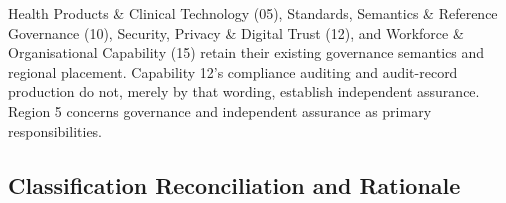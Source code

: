 Health Products \& Clinical Technology (05), Standards, Semantics \& Reference Governance (10), Security, Privacy \& Digital Trust (12), and Workforce \& Organisational Capability (15) retain their existing governance semantics and regional placement. Capability 12's compliance auditing and audit-record production do not, merely by that wording, establish independent assurance. Region 5 concerns governance and independent assurance as primary responsibilities.

\label{rad:business:1164}

\par\smallskip
{}\label{rad:business:1167}
\subsection*{Classification Reconciliation and Rationale}
\label{rad:business:1169}
\begingroup\small\setlength{\TableWidth}{\dimexpr\linewidth-6\tabcolsep-4\arrayrulewidth\relax}
